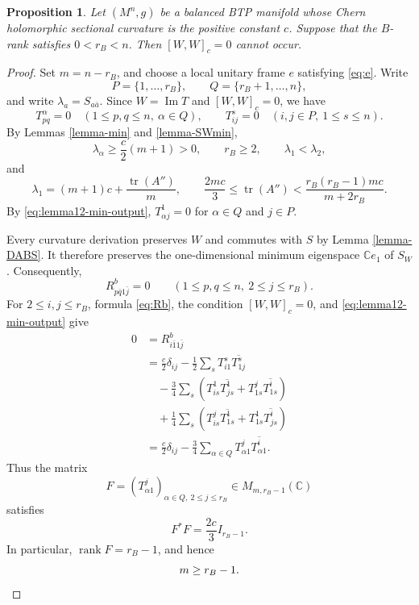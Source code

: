 \documentclass{amsart}
\newtheorem{proposition}{Proposition}
\newcommand{\C}{{\mathbb C}}
\begin{document}
\begin{proposition}\label{prop2}
Let $(M^n,g)$ be a balanced BTP manifold   whose  Chern holomorphic
sectional curvature   is the positive constant $c$. Suppose that the
 $B$-rank satisfies $0<r_B<n$. Then $[W,W]_c=0$ cannot occur.
\end{proposition}

\begin{proof}
  {Set $m=n-r_B$, and choose } a local unitary frame   {$e$ satisfying
\eqref{eq:e}. Write
}\[
 {P=\{1,\ldots,r_B\},\qquad Q=\{r_B+1,\ldots,n\},
}\]
{and write $\lambda_a=S_{a\bar a}$. Since $W=\operatorname{Im}T$ } and
 $[W,W]_c=0$, we have
  \[
 {T^\alpha_{pq}=0
 \quad (1\leq p,q\leq n,\ \alpha\in Q),
 \qquad
 T^s_{ij}=0
 \quad (i,j\in P,\ 1\leq s\leq n).
}\]
  {By Lemmas \ref{lemma-min} and \ref{lemma-SWmin},
}\[
 {\lambda_\alpha\geq\frac{c}{2}(m+1)>0,\qquad
 r_B\geq2,\qquad \lambda_1<\lambda_2,
}\]
{and
}\[
 {\lambda_1=(m+1)c+\frac{\operatorname{tr}(A'')}{m},\qquad
 \frac{2mc}{3}\leq\operatorname{tr}(A'')<
 \frac{r_B(r_B-1)mc}{m+2r_B}.
}\]
{By \eqref{eq:lemma12-min-output},
$T^1_{\alpha j}=0$ for $\alpha\in Q$ and $j\in P$.
}

{Every curvature derivation } preserves $W$  and commutes with $S$ by
Lemma \ref{lemma-DABS}{. It therefore preserves the one-dimensional
minimum eigenspace $\C e_1$ } of $S_W${. Consequently,
}\[
 {R^b_{p\bar q1\bar j}=0
 \qquad (1\leq p,q\leq n,\ 2\leq j\leq r_B).
}\]
{For } $2\leq i,j\leq r_B$,  {formula \eqref{eq:Rb}, the condition
$[W,W]_c=0$, and \eqref{eq:lemma12-min-output} give
}\begin{align*}
{0
 }&{=R^b_{i\bar1 1\bar j} }\\
 &{=\frac{c}{2}\delta_{ij}
   -\frac{1}{2}\sum_sT^s_{i1}\overline{T^s_{1j}}}\\
 &{\quad-\frac{3}{4}\sum_s\left(
   T^1_{is}\overline{T^1_{js}}
   +T^j_{1s}\overline{T^i_{1s}}\right)}\\
 &{\quad+\frac{1}{4}\sum_s\left(
   T^j_{is}\overline{T^1_{1s}}
   +T^1_{1s}\overline{T^i_{js}}\right)}\\
 &{=\frac{c}{2}\delta_{ij}
   -\frac{3}{4}\sum_{\alpha\in Q}
   T^j_{\alpha1}\overline{T^i_{\alpha1}}.
}\end{align*}
  {Thus the matrix
}\[
 {F=(T^j_{\alpha1})_{\alpha\in Q,\ 2\leq j\leq r_B}
 \in M_{m,r_B-1}(\C)
}\]
  {satisfies
}\[
 {F^\ast F=\frac{2c}{3}I_{r_B-1}.
}\]
{In particular, $\operatorname{rank}F=r_B-1$, and hence
}\begin{equation}{\label{eq:rm}
 m\geq r_B-1.
}\end{equation}


\end{proof}
\end{document}
